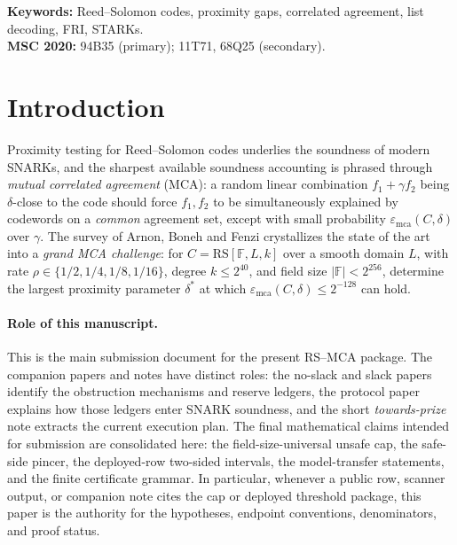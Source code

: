 \documentclass[11pt]{article}
\theoremstyle{definition}
\theoremstyle{remark}
\newcommand{\F}{\mathbb{F}}
\newcommand{\RS}{\mathrm{RS}}
\newcommand{\emca}{\varepsilon_{\mathrm{mca}}}
\begin{document}
\medskip
\noindent\textbf{Keywords:} Reed--Solomon codes, proximity gaps, correlated agreement, list decoding, FRI, STARKs.\\
\textbf{MSC 2020:} 94B35 (primary); 11T71, 68Q25 (secondary).

{\small\setcounter{tocdepth}{2}\tableofcontents}

\section{Introduction}\label{sec:intro}

Proximity testing for Reed--Solomon codes underlies the soundness of modern SNARKs, and the sharpest available soundness accounting is phrased through \emph{mutual correlated agreement} (MCA): a random linear combination $f_1+\gamma f_2$ being $\delta$-close to the code should force $f_1,f_2$ to be simultaneously explained by codewords on a \emph{common} agreement set, except with small probability $\emca(C,\delta)$ over $\gamma$. The survey of Arnon, Boneh and Fenzi \cite{ABF26} crystallizes the state of the art into a \emph{grand MCA challenge}: for $C=\RS[\F,L,k]$ over a smooth domain $L$, with rate $\rho\in\{1/2,1/4,1/8,1/16\}$, degree $k\le2^{40}$, and field size $|\F|<2^{256}$, determine the largest proximity parameter $\delta^*$ at which $\emca(C,\delta)\le2^{-128}$ can hold.

\paragraph{Role of this manuscript.}
This is the main submission document for the present RS--MCA package.  The
companion papers and notes have distinct roles: the no-slack and slack papers
identify the obstruction mechanisms and reserve ledgers, the protocol paper
explains how those ledgers enter SNARK soundness, and the short
\emph{towards-prize} note extracts the current execution plan.  The final
mathematical claims intended for submission are consolidated here: the
field-size-universal unsafe cap, the safe-side pincer, the deployed-row
two-sided intervals, the model-transfer statements, and the finite certificate
grammar.  In particular, whenever a public row, scanner output, or companion
note cites the cap or deployed threshold package, this paper is the authority
for the hypotheses, endpoint conventions, denominators, and proof status.
\end{document}

